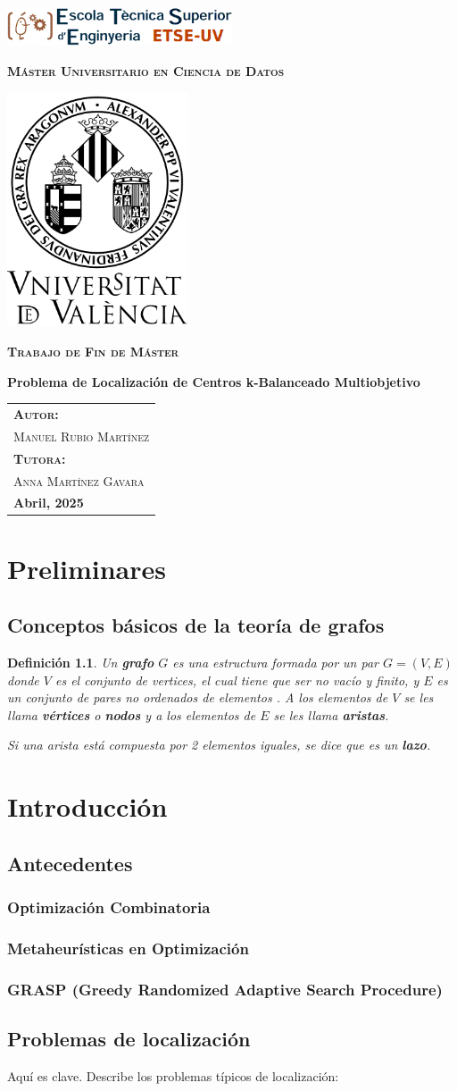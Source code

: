 \documentclass[12pt,a4paper]{book}
\newtheorem{defi}{Definición}[section]
\newcommand{\nuevaportada}[6]{
    \thispagestyle{empty}
    \begin{center}
        \includegraphics[width=0.5\textwidth]{images/logo.png}
        
        \vspace{0.5cm}
        {\Large\bfseries\textsc{M\'aster Universitario en #1}\par}
        
        \vspace{0.5cm}
        \includegraphics[width=0.4\textwidth]{images/uv.png}
        
        \vspace{0.5cm}
        {\Large\bfseries\textsc{Trabajo de Fin de M\'aster}\par}
        
        \vspace{0.5cm}
        {\Large\bfseries #2\par}
        
        \vspace{2cm}
        \begin{flushright}
            \begin{tabular}{l} 
                {\large\bfseries\textsc{Autor:}} \\
                {\large\textsc{#3}} \\ [0.5cm] 
                {\large\bfseries\textsc{Tutora:}} \\ 
                {\large\textsc{#4}} \\ [0.5cm]
                {\large\bfseries #5} 
            \end{tabular}
        \end{flushright}
    \end{center}
    \clearpage
}
\begin{document}
\nuevaportada{Ciencia de Datos}{Problema de Localización de Centros k-Balanceado Multiobjetivo}{Manuel Rubio Martínez}{Anna Martínez Gavara}{Abril, 2025}

\clearpage

\newpage
\tableofcontents

\chapter{Preliminares}
\section{Conceptos básicos de la teoría de grafos}

\begin{defi}
Un \textbf{grafo} $G$ es una estructura formada por un par $G=(V,E)$ donde $V$ es el conjunto de vertices, el cual
tiene que ser no vacío y finito, y $E$ es un conjunto de pares no ordenados de elementos . A los elementos
de $V$ se les llama \textbf{vértices} o \textbf{nodos} y a los elementos de $E$ se les llama \textbf{aristas}.

\smallskip

Si una arista está compuesta por 2 elementos iguales, se dice que es un \textbf{lazo}.

\end{defi}

\bigskip

\chapter{Introducción}

\section{Antecedentes}
\subsection{Optimización Combinatoria}
\subsection{Metaheurísticas en Optimización}
\subsection{GRASP (Greedy Randomized Adaptive Search Procedure)}

\section{Problemas de localización}
Aquí es clave. Describe los problemas típicos de localización:
\end{document}
